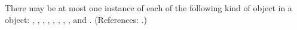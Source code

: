 There may be at most one instance of each of the following kind of object
in a \Model object: {\ListOfFunctionDefinitions,
\ListOfUnitDefinitions, \ListOfCompartments, \ListOfSpecies,
\ListOfParameters, \ListOfInitialAssignments, \ListOfRules,
\ListOfConstraints, \ListOfReactions} and
{\ListOfEvents}. (References: .)
